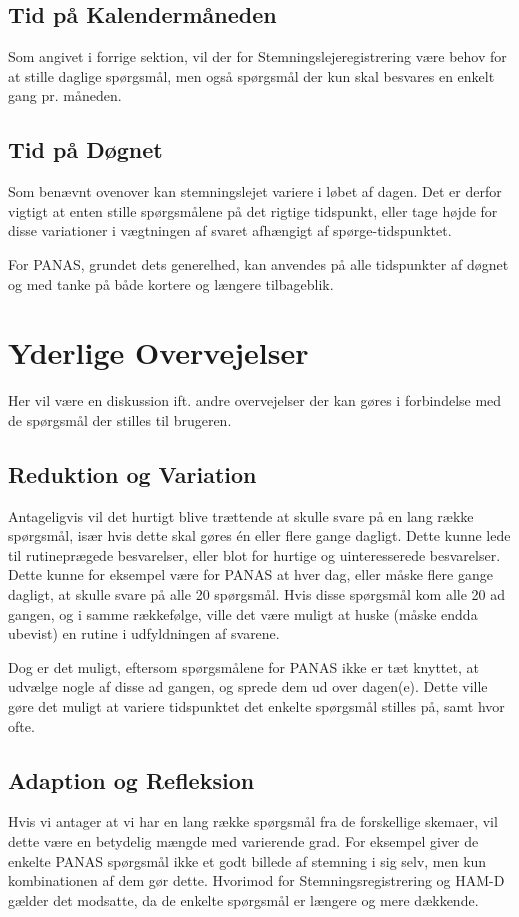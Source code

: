 \subsection{Tid på Kalendermåneden}
Som angivet i forrige sektion, vil der for Stemningslejeregistrering være behov for at stille daglige spørgsmål, men også spørgsmål der kun skal besvares en enkelt gang pr. måneden.

\subsection{Tid på Døgnet}
Som benævnt ovenover kan stemningslejet variere i løbet af dagen.
Det er derfor vigtigt at enten stille spørgsmålene på det rigtige tidspunkt, eller tage højde for disse variationer i vægtningen af svaret afhængigt af spørge-tidspunktet.

For PANAS, grundet dets generelhed, kan anvendes på alle tidspunkter af døgnet og med tanke på både kortere og længere tilbageblik.

\section{Yderlige Overvejelser}
Her vil være en diskussion ift. andre overvejelser der kan gøres i forbindelse med de spørgsmål der stilles til brugeren.

\subsection{Reduktion og Variation}
Antageligvis vil det hurtigt blive trættende at skulle svare på en lang række spørgsmål, især hvis dette skal gøres én eller flere gange dagligt.
Dette kunne lede til rutineprægede besvarelser, eller blot for hurtige og uinteresserede besvarelser.
Dette kunne for eksempel være for PANAS at hver dag, eller måske flere gange dagligt, at skulle svare på alle 20 spørgsmål.
Hvis disse spørgsmål kom alle 20 ad gangen, og i samme rækkefølge, ville det være muligt at huske (måske endda ubevist) en rutine i udfyldningen af svarene.

Dog er det muligt, eftersom spørgsmålene for PANAS ikke er tæt knyttet, at udvælge nogle af disse ad gangen, og sprede dem ud over dagen(e).
Dette ville gøre det muligt at variere tidspunktet det enkelte spørgsmål stilles på, samt hvor ofte.

\subsection{Adaption og Refleksion}
Hvis vi antager at vi har en lang række spørgsmål fra de forskellige skemaer, vil dette være en betydelig mængde med varierende grad.
For eksempel giver de enkelte PANAS spørgsmål ikke et godt billede af stemning i sig selv, men kun kombinationen af dem gør dette.
Hvorimod for Stemningsregistrering og HAM-D gælder det modsatte, da de enkelte spørgsmål er længere og mere dækkende.

